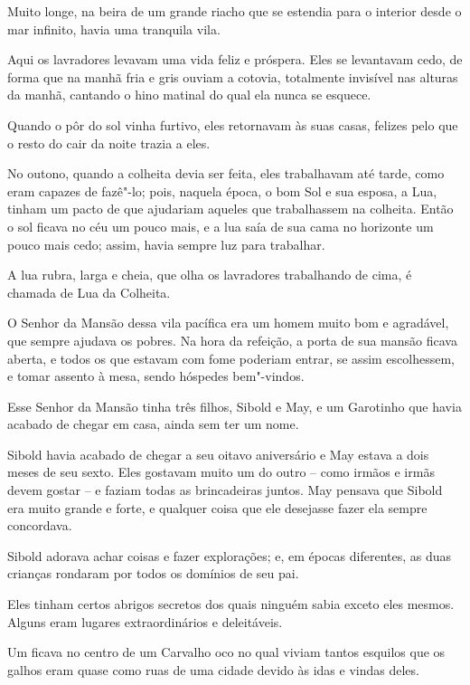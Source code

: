  

Muito longe, na beira de um grande riacho que se estendia para o
interior desde o mar infinito, havia uma tranquila vila.

Aqui os lavradores levavam uma vida feliz e próspera. Eles se levantavam
cedo, de forma que na manhã fria e gris ouviam a cotovia, totalmente
invisível nas alturas da manhã, cantando o hino matinal do qual ela
nunca se esquece.

Quando o pôr do sol vinha furtivo, eles retornavam às suas casas,
felizes pelo que o resto do cair da noite trazia a eles.

No outono, quando a colheita devia ser feita, eles trabalhavam até
tarde, como eram capazes de fazê"-lo; pois, naquela época, o bom Sol e
sua esposa, a Lua, tinham um pacto de que ajudariam aqueles que
trabalhassem na colheita. Então o sol ficava no céu um pouco mais, e a
lua saía de sua cama no horizonte um pouco mais cedo; assim, havia
sempre luz para trabalhar.

A lua rubra, larga e cheia, que olha os lavradores trabalhando de cima,
é chamada de Lua da Colheita.

O Senhor da Mansão dessa vila pacífica era um homem muito bom e
agradável, que sempre ajudava os pobres. Na hora da refeição, a porta de
sua mansão ficava aberta, e todos os que estavam com fome poderiam
entrar, se assim escolhessem, e tomar assento à mesa, sendo hóspedes
bem"-vindos.

Esse Senhor da Mansão tinha três filhos, Sibold e May, e um Garotinho
que havia acabado de chegar em casa, ainda sem ter um nome.

Sibold havia acabado de chegar a seu oitavo aniversário e May estava a
dois meses de seu sexto. Eles gostavam muito um do outro -- como irmãos
e irmãs devem gostar -- e faziam todas as brincadeiras juntos. May
pensava que Sibold era muito grande e forte, e qualquer coisa que ele
desejasse fazer ela sempre concordava.

Sibold adorava achar coisas e fazer explorações; e, em épocas
diferentes, as duas crianças rondaram por todos os domínios de seu pai.

Eles tinham certos abrigos secretos dos quais ninguém sabia exceto eles
mesmos. Alguns eram lugares extraordinários e deleitáveis.

Um ficava no centro de um Carvalho oco no qual viviam tantos esquilos
que os galhos eram quase como ruas de uma cidade devido às idas e vindas
deles.

